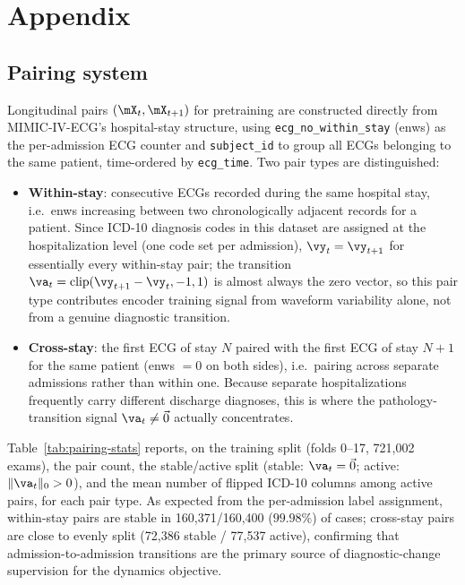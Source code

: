 \section{Appendix}

\subsection{Pairing system}
\label{sec:pairing-appendix}

Longitudinal pairs $(\mX_t, \mX_{t+1})$ for pretraining are constructed directly from MIMIC-IV-ECG's hospital-stay structure, using \texttt{ecg\_no\_within\_stay} (enws) as the per-admission ECG counter and \texttt{subject\_id} to group all ECGs belonging to the same patient, time-ordered by \texttt{ecg\_time}. Two pair types are distinguished:

\begin{itemize}
\item \textbf{Within-stay}: consecutive ECGs recorded during the same hospital stay, i.e.\ enws increasing between two chronologically adjacent records for a patient. Since ICD-10 diagnosis codes in this dataset are assigned at the hospitalization level (one code set per admission), $\vy_t = \vy_{t+1}$ for essentially every within-stay pair; the transition $\va_t = \text{clip}(\vy_{t+1}-\vy_t,-1,1)$ is almost always the zero vector, so this pair type contributes encoder training signal from waveform variability alone, not from a genuine diagnostic transition.
\item \textbf{Cross-stay}: the first ECG of stay $N$ paired with the first ECG of stay $N+1$ for the same patient (enws $=0$ on both sides), i.e.\ pairing across separate admissions rather than within one. Because separate hospitalizations frequently carry different discharge diagnoses, this is where the pathology-transition signal $\va_t \ne \vec{0}$ actually concentrates.
\end{itemize}

Table~\ref{tab:pairing-stats} reports, on the training split (folds 0--17, 721{,}002 exams), the pair count, the stable/active split (stable: $\va_t=\vec{0}$; active: $\lVert\va_t\rVert_0>0$), and the mean number of flipped ICD-10 columns among active pairs, for each pair type. As expected from the per-admission label assignment, within-stay pairs are stable in 160{,}371/160{,}400 ($99.98\%$) of cases; cross-stay pairs are close to evenly split (72{,}386 stable / 77{,}537 active), confirming that admission-to-admission transitions are the primary source of diagnostic-change supervision for the dynamics objective.

